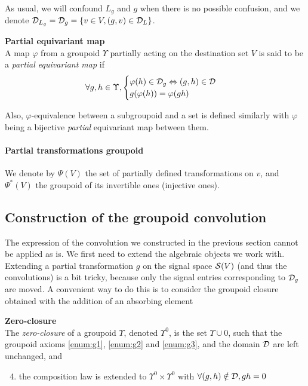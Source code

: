 \begin{remark}
As usual, we will confound $L_g$ and $g$ when there is no possible confusion, and we denote $\mathcal{D}_{L_g} = \mathcal{D}_g = \{ v \in V, (g,v) \in \mathcal{D}_L \}$.
\end{remark}

\begin{definition}\textbf{Partial equivariant map}\\
A map $\varphi$ from a groupoid $\Upsilon$ partially acting on the destination set $V$ is said to be a \emph{partial equivariant map} if
\begin{gather*}
\forall g,h \in \Upsilon,
  \begin{cases}
    \varphi(h) \in \mathcal{D}_g \Leftrightarrow (g,h) \in \mathcal{D}\\
    g(\varphi(h)) = \varphi(gh)
  \end{cases}
\end{gather*}
\end{definition}

Also, $\varphi$-equivalence between a subgroupoid and a set is defined similarly with $\varphi$ being a bijective \emph{partial} equivariant map between them.

\paragraph{Partial transformations groupoid}
We denote by $\Psi(V)$ the set of partially defined transformations on $v$, and $\Psi^*(V)$ the groupoid of its invertible ones (\ie injective ones).

\subsection{Construction of the groupoid convolution}

The expression of the convolution we constructed in the previous section cannot be applied as is. We first need to extend the algebraic objects we work with. 
Extending a partial transformation $g$ on the signal space $\mathcal{S}(V)$ (and thus the convolutions) is a bit tricky, because only the signal entries corresponding to $\mathcal{D}_g$ are moved. A convenient way to do this is to consider the groupoid closure obtained with the addition of an absorbing element

\begin{definition}\textbf{Zero-closure}\\
The \emph{zero-closure} of a groupoid $\Upsilon$, denoted $\Upsilon^0$, is the set $\Upsilon \cup {0}$, such that the groupoid axioms \ref{enum:g1}, \ref{enum:g2} and \ref{enum:g3}, and the domain $\mathcal{D}$ are left unchanged, and
\begin{enumerate}\setcounter{enumi}{3}
\item the composition law is extended to $\Upsilon^0 \times \Upsilon^0$ with $\forall (g,h) \notin \mathcal{D}, gh = 0$
\end{enumerate}
\end{definition}

